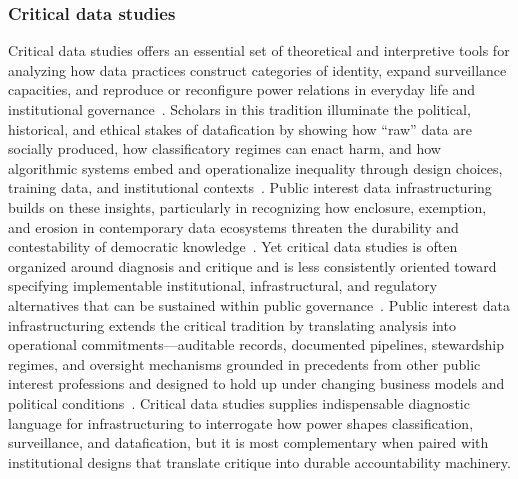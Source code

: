 \documentclass[acmsmall,screen]{acmart}
\begin{document}
\subsubsection*{Critical data studies}
Critical data studies offers an essential set of theoretical and interpretive tools for analyzing how data practices construct categories of identity, expand surveillance capacities, and reproduce or reconfigure power relations in everyday life and institutional governance~\cite{boydCriticalQuestionsBig2012,vandijckDataficationDataismDataveillance2014,puschmannBigDataBig2014}. Scholars in this tradition illuminate the political, historical, and ethical stakes of datafication by showing how ``raw'' data are socially produced, how classificatory regimes can enact harm, and how algorithmic systems embed and operationalize inequality through design choices, training data, and institutional contexts~\cite{dentonGenealogyMachineLearning2021,greenDataSciencePolitical2021}. Public interest data infrastructuring builds on these insights, particularly in recognizing how enclosure, exemption, and erosion in contemporary data ecosystems threaten the durability and contestability of democratic knowledge~\cite{Freelon_ComputationalResearchPostAPI_2018,taylorPublicActorsPublic2021,Bruns_APIcalypsesocialmedia_2019}. Yet critical data studies is often organized around diagnosis and critique and is less consistently oriented toward specifying implementable institutional, infrastructural, and regulatory alternatives that can be sustained within public governance~\cite{latourWhyHasCritique2004,neffCritiqueContributePracticeBased2017}. Public interest data infrastructuring extends the critical tradition by translating analysis into operational commitments---auditable records, documented pipelines, stewardship regimes, and oversight mechanisms grounded in precedents from other public interest professions and designed to hold up under changing business models and political conditions~\cite{acker_DataCraftTheory_2019,schwartz_archives_2002,hutchinsonAccountabilityMachineLearning2021}. Critical data studies supplies indispensable diagnostic language for infrastructuring to interrogate how power shapes classification, surveillance, and datafication, but it is most complementary when paired with institutional designs that translate critique into durable accountability machinery.
\end{document}
